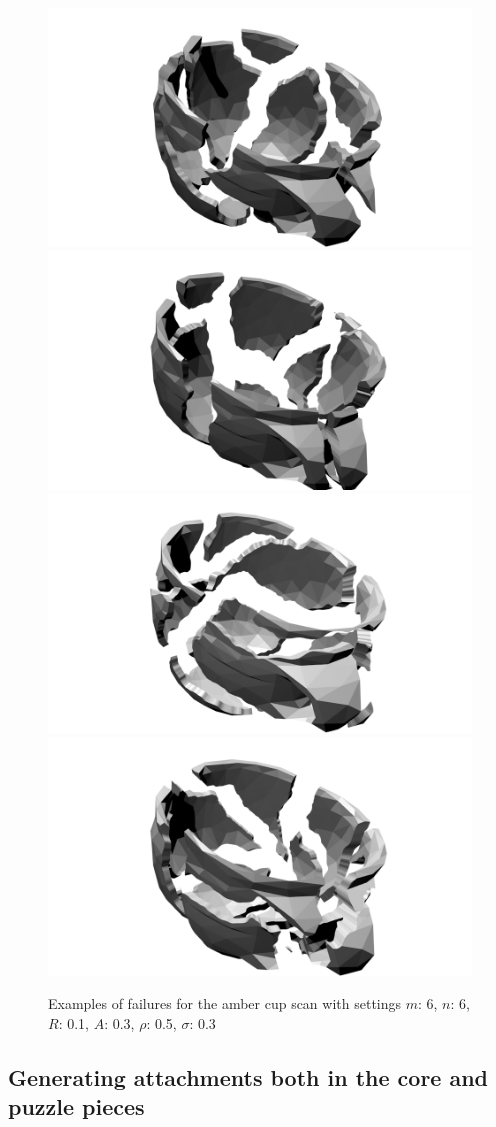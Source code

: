 \documentclass[acmlarge,screen,dvipsnames]{acmart}
\begin{document}
\begin{figure}[htb]
  \centering
  {\includegraphics[width=0.45\linewidth]{images/rotation01}}%
  {\includegraphics[width=0.45\linewidth]{images/rotation02}}%
  \hspace{0.2in}%
   {\includegraphics[width=0.45\linewidth]{images/rotation03}}
   \hspace{0.2in}
  {\includegraphics[width=0.45\linewidth]{images/rotation04}}%
  \caption{Examples of failures for the amber cup scan with settings $m$: 6, $n$: 6, $R$: 0.1, $A$: 0.3, $\rho$: 0.5, $\sigma$: 0.3}
\end{figure}




\subsection{Generating attachments both in the core and puzzle pieces}
\end{document}
